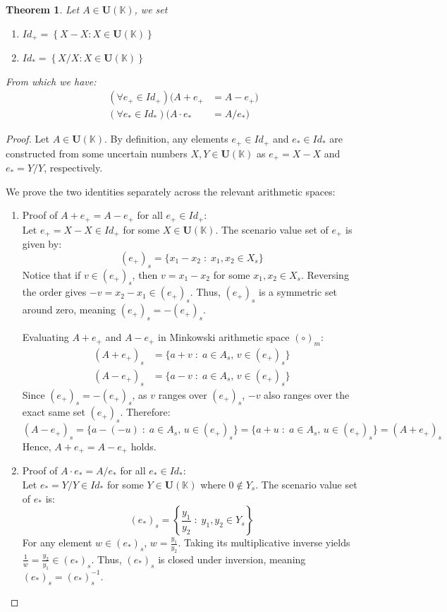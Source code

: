 \documentclass[a4paper,12pt, twoside]{memoir}
\newtheorem{theorem}{Theorem}[chapter]
\newcommand{\set}[1]{\left\{#1\right\}} %
\newcommand{\tsbd}[1]{\mathbf{U}(\mathbb{#1})}
\begin{document}
\begin{theorem}
	Let $A \in \tsbd{K}$, we set
	\begin{enumerate}[leftmargin=*]
		\item $Id_+=\set{X-X: X \in \tsbd{K}}$
		\item $Id_*=\set{X/X: X \in \tsbd{K}}$
	\end{enumerate}
	From which we have:
	\begin{align*}
		(\forall e_+ \in Id_+)(A + e_+     & = A - e_+) \\
		(\forall e_* \in Id_*)(A \cdot e_* & = A / e_*)
	\end{align*}
\end{theorem}
\begin{proof}
	Let $A \in \tsbd{K}$. By definition, any elements $e_+ \in Id_+$ and $e_* \in Id_*$ are constructed from some uncertain numbers $X, Y \in \tsbd{K}$ as $e_+ = X - X$ and $e_* = Y / Y$, respectively.

	We prove the two identities separately across the relevant arithmetic spaces:

	\begin{enumerate}[leftmargin=*]
		\item Proof of $A + e_+ = A - e_+$ for all $e_+ \in Id_+$: \\
		      Let $e_+ = X - X \in Id_+$ for some $X \in \tsbd{K}$. The scenario value set of $e_+$ is given by:
		      \[
			      (e_+)_s = \{x_1 - x_2 \;:\; x_1, x_2 \in X_s\}
		      \]
		      Notice that if $v \in (e_+)_s$, then $v = x_1 - x_2$ for some $x_1, x_2 \in X_s$. Reversing the order gives $-v = x_2 - x_1 \in (e_+)_s$. Thus, $(e_+)_s$ is a symmetric set around zero, meaning $(e_+)_s = -(e_+)_s$.

		      Evaluating $A + e_+$ and $A - e_+$ in Minkowski arithmetic space $(\circ)_m$:
		      \begin{align*}
			      (A + e_+)_s & = \{a + v \;:\; a \in A_s, \, v \in (e_+)_s\} \\
			      (A - e_+)_s & = \{a - v \;:\; a \in A_s, \, v \in (e_+)_s\}
		      \end{align*}
		      Since $(e_+)_s = -(e_+)_s$, as $v$ ranges over $(e_+)_s$, $-v$ also ranges over the exact same set $(e_+)_s$. Therefore:
		      \[
			      (A - e_+)_s = \{a - (-u) \;:\; a \in A_s, \, u \in (e_+)_s\} = \{a + u \;:\; a \in A_s, \, u \in (e_+)_s\} = (A + e_+)_s
		      \]
		      Hence, $A + e_+ = A - e_+$ holds.

		\item Proof of $A \cdot e_* = A / e_*$ for all $e_* \in Id_*$: \\
		      Let $e_* = Y / Y \in Id_*$ for some $Y \in \tsbd{K}$ where $0 \notin Y_s$. The scenario value set of $e_*$ is:
		      \[
			      (e_*)_s = \left\{ \frac{y_1}{y_2} \;:\; y_1, y_2 \in Y_s \right\}
		      \]
		      For any element $w \in (e_*)_s$, $w = \frac{y_1}{y_2}$. Taking its multiplicative inverse yields $\frac{1}{w} = \frac{y_2}{y_1} \in (e_*)_s$. Thus, $(e_*)_s$ is closed under inversion, meaning $(e_*)_s = (e_*)_s^{-1}$.


\end{enumerate}
\end{proof}
\end{document}
